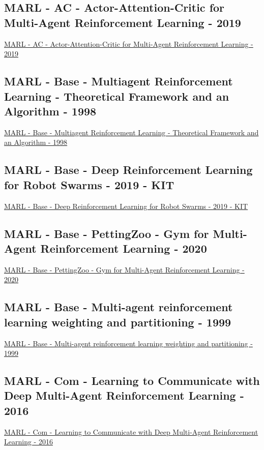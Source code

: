\subsection{MARL - AC - Actor-Attention-Critic for Multi-Agent Reinforcement Learning - 2019}
\href{http://proceedings.mlr.press/v97/iqbal19a.html}{MARL - AC - Actor-Attention-Critic for Multi-Agent Reinforcement Learning - 2019}

\subsection{MARL - Base - Multiagent Reinforcement Learning - Theoretical Framework and an Algorithm - 1998}
\href{https://dl.acm.org/doi/abs/10.5555/645527.657296}{MARL - Base - Multiagent Reinforcement Learning - Theoretical Framework and an Algorithm - 1998}

\subsection{MARL - Base - Deep Reinforcement Learning for Robot Swarms - 2019 - KIT}
\href{https://publikationen.bibliothek.kit.edu/1000118251}{MARL - Base - Deep Reinforcement Learning for Robot Swarms - 2019 - KIT}

\subsection{MARL - Base - PettingZoo - Gym for Multi-Agent Reinforcement Learning - 2020}
\href{https://arxiv.org/abs/2009.14471}{MARL - Base - PettingZoo - Gym for Multi-Agent Reinforcement Learning - 2020}

\subsection{MARL - Base - Multi-agent reinforcement learning weighting and partitioning - 1999}
\href{https://www.sciencedirect.com/science/article/pii/S0893608099000246}{MARL - Base - Multi-agent reinforcement learning weighting and partitioning - 1999}

\subsection{MARL - Com - Learning to Communicate with Deep Multi-Agent Reinforcement Learning - 2016}
\href{https://arxiv.org/abs/1605.06676}{MARL - Com - Learning to Communicate with Deep Multi-Agent Reinforcement Learning - 2016}


